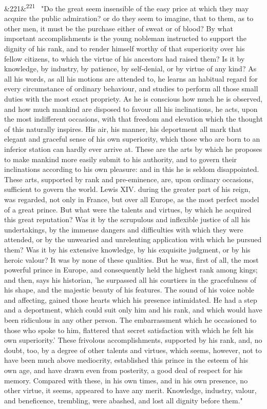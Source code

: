 \documentclass[12pt]{article}
\newcommand{\para}[1][]{\par\noindent\ifx&#1&\else\textsuperscript{\footnotesize #1}~\fi}
\begin{document}
\para[221] "Do the great seem insensible of the easy price at which they may acquire the public admiration? or do they seem to imagine, that to them, as to other men, it must be the purchase either of sweat or of blood? By what important accomplishments is the young nobleman instructed to support the dignity of his rank, and to render himself worthy of that superiority over his fellow citizens, to which the virtue of his ancestors had raised them? Is it by knowledge, by industry, by patience, by self-denial, or by virtue of any kind? As all his words, as all his motions are attended to, he learns an habitual regard for every circumstance of ordinary behaviour, and studies to perform all those small duties with the most exact propriety. As he is conscious how much he is observed, and how much mankind are disposed to favour all his inclinations, he acts, upon the most indifferent occasions, with that freedom and elevation which the thought of this naturally inspires. His air, his manner, his deportment all mark that elegant and graceful sense of his own superiority, which those who are born to an inferior station can hardly ever arrive at. These are the arts by which he proposes to make mankind more easily submit to his authority, and to govern their inclinations according to his own pleasure: and in this he is seldom disappointed. These arts, supported by rank and pre-eminence, are, upon ordinary occasions, sufficient to govern the world. Lewis XIV. during the greater part of his reign, was regarded, not only in France, but over all Europe, as the most perfect model of a great prince. But what were the talents and virtues, by which he acquired this great reputation? Was it by the scrupulous and inflexible justice of all his undertakings, by the immense dangers and difficulties with which they were attended, or by the unwearied and unrelenting application with which he pursued them? Was it by his extensive knowledge, by his exquisite judgment, or by his heroic valour? It was by none of these qualities. But he was, first of all, the most powerful prince in Europe, and consequently held the highest rank among kings; and then, says his historian, 'he surpassed all his courtiers in the gracefulness of his shape, and the majestic beauty of his features. The sound of his voice noble and affecting, gained those hearts which his presence intimidated. He had a step and a deportment, which could suit only him and his rank, and which would have been ridiculous in any other person. The embarrassment which he occasioned to those who spoke to him, flattered that secret satisfaction with which he felt his own superiority.' These frivolous accomplishments, supported by his rank, and, no doubt, too, by a degree of other talents and virtues, which seems, however, not to have been much above mediocrity, established this prince in the esteem of his own age, and have drawn even from posterity, a good deal of respect for his memory. Compared with these, in his own times, and in his own presence, no other virtue, it seems, appeared to have any merit. Knowledge, industry, valour, and beneficence, trembling, were abashed, and lost all dignity before them."
\end{document}
